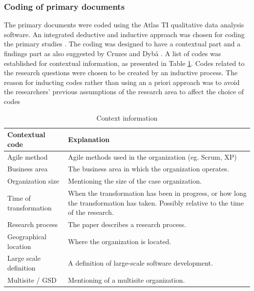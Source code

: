 \documentclass[preprint,authoryear,12pt]{elsarticle}
\begin{document}
\subsubsection{Coding of primary documents}
\label{sec:coding}

The primary documents were coded using the Atlas TI qualitative data analysis software.
An integrated deductive and inductive approach was chosen for coding the primary
studies \cite{Cruzes2011a}. The coding was designed to have a contextual part
and a findings part as also suggested by Cruzes and Dybå \cite{Cruzes2011a}. A
list of codes was established for contextual information, as presented in Table
\ref{table:contextualcodes}. Codes related to the research questions were chosen
to be created by an inductive process. The reason for inducting codes rather
than using an a priori approach was to avoid the researchers' previous
assumptions of the research area to affect the choice of codes

\begin{table}[h]
    \centering
    \begin{tabular}{ >{\raggedright\arraybackslash}p{}
                     >{\raggedright\arraybackslash}p{} }
        \toprule
        Contextual code     & Explanation   \\
        \midrule

Agile method & Agile methods used in the organization (eg. Scrum, XP) \\

Business area & The business area in which the organization operates. \\

Organization size & Mentioning the size of the case organization. \\

Time of transformation & When the transformation has been in
progress, or how long the transformation has taken. Possibly relative to
the time of the research. \\

Research process & The paper describes a research process. \\

Geographical location & Where the organization is located. \\

Large scale definition & A definition of large-scale software development. \\

Multisite / GSD & Mentioning of a multisite organization. \\

        \bottomrule
    \end{tabular}
    \caption{Context information}
    \label{table:contextualcodes}
\end{table}
\end{document}
